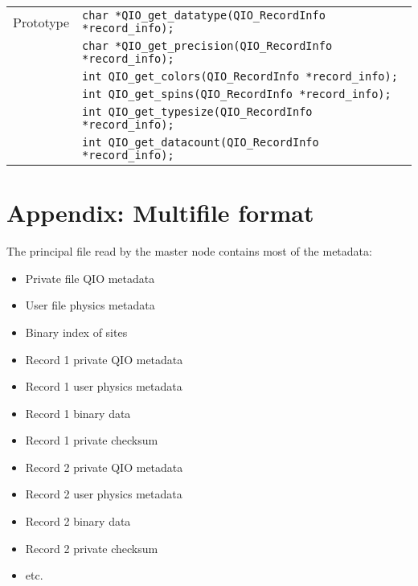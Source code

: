 \documentclass{article}
\begin{document}
%
\begin{flushleft}
  \begin{tabular}{|l|l|}
  \hline
  Prototype      & \verb|char *QIO_get_datatype(QIO_RecordInfo *record_info);| \\
                 & \verb|char *QIO_get_precision(QIO_RecordInfo *record_info);| \\
                 & \verb|int QIO_get_colors(QIO_RecordInfo *record_info);| \\
                 & \verb|int QIO_get_spins(QIO_RecordInfo *record_info);| \\
                 & \verb|int QIO_get_typesize(QIO_RecordInfo *record_info);| \\
                 & \verb|int QIO_get_datacount(QIO_RecordInfo *record_info);| \\
\hline
 \end{tabular}
\end{flushleft}
%




 

\section{Appendix: Multifile format}

The principal file read by the master node contains most of the metadata:

\begin{itemize}
  \item Private file QIO metadata
  \item User file physics metadata
  \item Binary index of sites
  \item Record 1 private QIO metadata
  \item Record 1 user physics metadata
  \item Record 1 binary data
  \item Record 1 private checksum
  \item Record 2 private QIO metadata
  \item Record 2 user physics metadata
  \item Record 2 binary data
  \item Record 2 private checksum
  \item etc.
\end{itemize}
\end{document}
